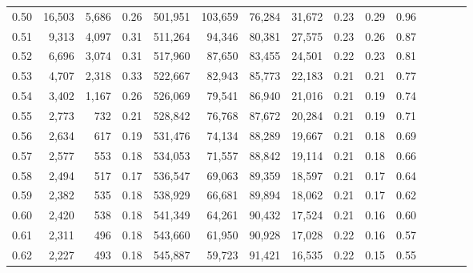 \begin{tabular}{rrrcrrrrrrrrrrr}
0.50 &  16,503 &  5,686 &                                       0.26 &  501,951 &  103,659 &   76,284 &   31,672 &  0.23 &  0.29 &                         0.96 \\
0.51 &   9,313 &  4,097 &                                       0.31 &  511,264 &   94,346 &   80,381 &   27,575 &  0.23 &  0.26 &                         0.87 \\
0.52 &   6,696 &  3,074 &                                       0.31 &  517,960 &   87,650 &   83,455 &   24,501 &  0.22 &  0.23 &                         0.81 \\
0.53 &   4,707 &  2,318 &                                       0.33 &  522,667 &   82,943 &   85,773 &   22,183 &  0.21 &  0.21 &                         0.77 \\
0.54 &   3,402 &  1,167 &                                       0.26 &  526,069 &   79,541 &   86,940 &   21,016 &  0.21 &  0.19 &                         0.74 \\
0.55 &   2,773 &    732 &                                       0.21 &  528,842 &   76,768 &   87,672 &   20,284 &  0.21 &  0.19 &                         0.71 \\
0.56 &   2,634 &    617 &                                       0.19 &  531,476 &   74,134 &   88,289 &   19,667 &  0.21 &  0.18 &                         0.69 \\
0.57 &   2,577 &    553 &                                       0.18 &  534,053 &   71,557 &   88,842 &   19,114 &  0.21 &  0.18 &                         0.66 \\
0.58 &   2,494 &    517 &                                       0.17 &  536,547 &   69,063 &   89,359 &   18,597 &  0.21 &  0.17 &                         0.64 \\
0.59 &   2,382 &    535 &                                       0.18 &  538,929 &   66,681 &   89,894 &   18,062 &  0.21 &  0.17 &                         0.62 \\
0.60 &   2,420 &    538 &                                       0.18 &  541,349 &   64,261 &   90,432 &   17,524 &  0.21 &  0.16 &                         0.60 \\
0.61 &   2,311 &    496 &                                       0.18 &  543,660 &   61,950 &   90,928 &   17,028 &  0.22 &  0.16 &                         0.57 \\
0.62 &   2,227 &    493 &                                       0.18 &  545,887 &   59,723 &   91,421 &   16,535 &  0.22 &  0.15 &                         0.55 \\

\end{tabular}
